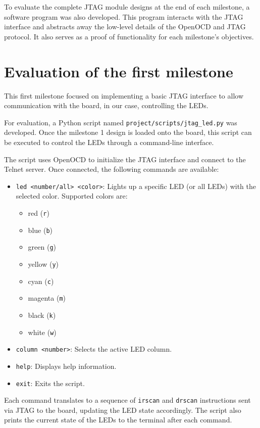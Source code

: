 \documentclass[a4paper,11pt,oneside]{report}
\begin{document}
To evaluate the complete JTAG module designs at the end of each milestone, a software program was also developed.  
This program interacts with the JTAG interface and abstracts away the low-level details of the OpenOCD and JTAG protocol.  
It also serves as a proof of functionality for each milestone's objectives.

\section{Evaluation of the first milestone}

This first milestone focused on implementing a basic JTAG interface to allow communication with the board, in our case, controlling the LEDs.

For evaluation, a Python script named \texttt{project/scripts/jtag\_led.py} was developed.  
Once the milestone 1 design is loaded onto the board, this script can be executed to control the LEDs through a command-line interface.

The script uses OpenOCD to initialize the JTAG interface and connect to the Telnet server.  
Once connected, the following commands are available:
\begin{itemize}
    \item \texttt{led <number/all> <color>}: Lights up a specific LED (or all LEDs) with the selected color. Supported colors are:
    \begin{itemize}
        \item red (\texttt{r})
        \item blue (\texttt{b})
        \item green (\texttt{g})
        \item yellow (\texttt{y})
        \item cyan (\texttt{c})
        \item magenta (\texttt{m})
        \item black (\texttt{k})
        \item white (\texttt{w})
    \end{itemize}
    \item \texttt{column <number>}: Selects the active LED column.
    \item \texttt{help}: Displays help information.
    \item \texttt{exit}: Exits the script.
\end{itemize}

Each command translates to a sequence of \texttt{irscan} and \texttt{drscan} instructions sent via JTAG to the board, updating the LED state accordingly.  
The script also prints the current state of the LEDs to the terminal after each command.
\end{document}
